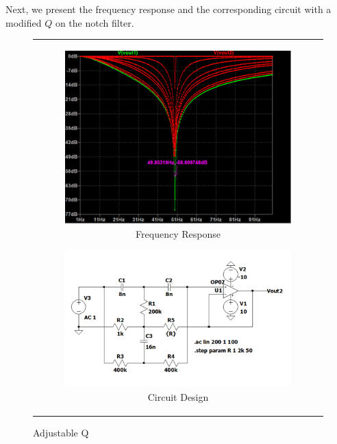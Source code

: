 \documentclass[hidelinks,12pt]{article}
\begin{document}
	Next, we present the frequency response and the corresponding circuit with a modified \( Q \) on the notch filter.
	

	\begin{figure}[!h]
		\centering
			\begin{tabular}{c}
				\begin{subfigure}[t]{0.45\textwidth}
					\centering
					\includegraphics[width=\textwidth]{figures/Notch Filter Design/freq_response_adjustable_q}
					\caption{Frequency Response}
				\end{subfigure}
				\hfill
				\begin{subfigure}[t]{0.5\textwidth}
					\centering
					\includegraphics[width=\textwidth]{figures/Notch Filter Design/adjustable_q_circuit}
					\caption{Circuit Design}
				\end{subfigure} \\
			\end{tabular}
		\caption{Adjustable Q}
	\end{figure}
\end{document}
